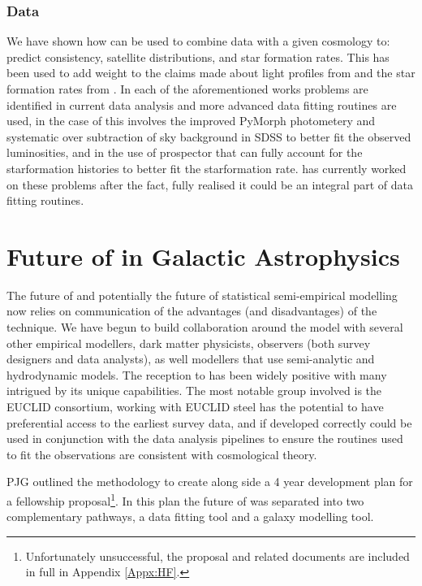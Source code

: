 \subsubsection{Data}

We have shown how \steel can be used to combine data with a given cosmology to: predict consistency, satellite distributions, and star formation rates. This has been used to add weight to the claims made about light profiles from \citet{Bernardi2017ComparingLight} and the star formation rates from \citet{Leja2019AnSurvey}. In each of the aforementioned works problems are identified in current data analysis and more advanced data fitting routines are used, in the case of \citet{Bernardi2017ComparingLight} this involves the improved PyMorph photometery and systematic over subtraction of sky background in SDSS to better fit the observed luminosities, and in \citet{Leja2019AnSurvey} the use of prospector that can fully account for the starformation histories to better fit the starformation rate. \steel has currently worked on these problems after the fact, fully realised it could be an integral part of data fitting routines.

\section{Future of \steel in Galactic Astrophysics}
\label{sec:Future}

The future of \steel and potentially the future of statistical semi-empirical modelling now relies on communication of the advantages (and disadvantages) of the technique. We have begun to build collaboration around the model with several other empirical modellers, dark matter physicists, observers (both survey designers and data analysts), as well modellers that use semi-analytic and hydrodynamic models. The reception to \steel has been widely positive with many intrigued by its unique capabilities. The most notable group involved is the EUCLID consortium, working with EUCLID steel has the potential to have preferential access to the earliest survey data, and if developed correctly could be used in conjunction with the data analysis pipelines to ensure the routines used to fit the observations are consistent with cosmological theory.

PJG outlined the methodology to create \steel along side a 4 year development plan for a fellowship proposal\footnote{Unfortunately unsuccessful, the proposal and related documents are included in full in Appendix \ref{Appx:HF}.}. In this plan the future of \steel was separated into two complementary pathways, a data fitting tool and a galaxy modelling tool. 

